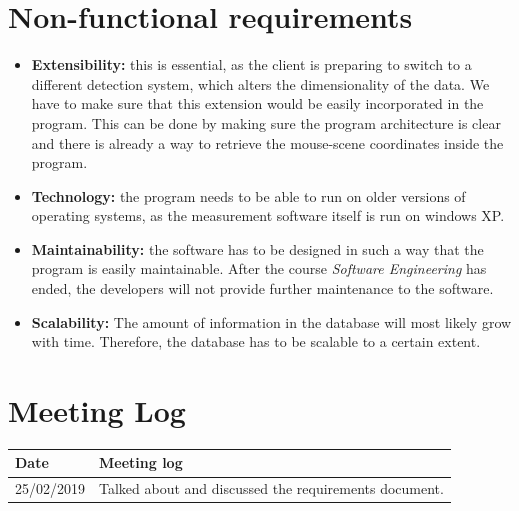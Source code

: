 \documentclass{article}
\begin{document}
\section{Non-functional requirements}
\begin{itemize}
	\item \textbf{Extensibility:} this is essential, as the client is preparing to switch to a different detection system, which alters the dimensionality of the data. We have to make sure that this extension would be easily incorporated in the program. This can be done by making sure the program architecture is clear and there is already a way to retrieve the mouse-scene coordinates inside the program.
	\item \textbf{Technology:} the program needs to be able to run on older versions of operating systems, as the measurement software itself is run on windows XP. 
	\item \textbf{Maintainability: } the software has to be designed in such a way that the program is easily  maintainable. After the course \textit{Software Engineering} has ended, the developers will not provide further maintenance to the software. 
	\item \textbf{Scalability: } The amount of information in the database will most likely grow with time. Therefore, the database has to be scalable to a certain extent. 
\end{itemize}
\printglossary[type =\acronymtype]

\printglossary

\section{Meeting Log}
\begin{center}
 \begin{tabular}{ | l | l | }
  \hline
  \bf{Date} & \bf{Meeting log} \\
  \hline
  25/02/2019 & Talked about and discussed the requirements document. \\
  \hline
 \end{tabular}
\end{center}

\newpage
\end{document}
